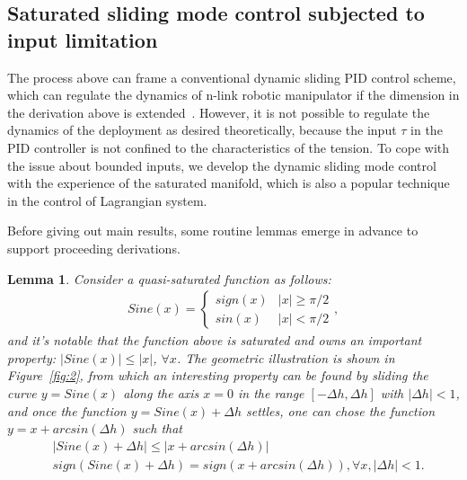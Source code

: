 \documentclass[3p]{elsarticle}
\theoremstyle{plain}
\newtheorem{mylem}{Lemma}
\theoremstyle{remark}
\begin{document}
\subsection{Saturated sliding mode control subjected to input limitation}
The process above can frame a conventional dynamic sliding PID control scheme, which can regulate the dynamics of n-link robotic manipulator if the dimension in the derivation above is extended~\cite{parra2003dynamic}. However, it is not possible to regulate the dynamics of the deployment as desired theoretically, because the input $\tau$ in the PID controller is not confined to the characteristics of the tension. To cope with the issue about bounded inputs, we develop the dynamic sliding mode control with the experience of the saturated manifold, which is also a popular technique in the control of Lagrangian system.\par
Before giving out main results, some routine lemmas emerge in advance to support proceeding derivations.
\begin{mylem}\label{lemma:1}
Consider a quasi-saturated function as follows:
\begin{align}
Sine(x) =
\begin{cases}
sign(x)&\vert x\vert\ge\pi/2\\
sin(x)&\vert x\vert<\pi/2
\end{cases},
\end{align}
and it's notable that the function above is saturated and owns an important property: $\vert Sine(x)\vert\le\vert x\vert$, $\forall x$. The geometric illustration is shown in Figure~\ref{fig:2}, from which an interesting property can be found by sliding the curve $y=Sine(x)$ along the axis $x=0$ in the range $[-\Delta h,\Delta h]$ with $\vert \Delta h \vert< 1$, and once the function $y=Sine(x)+\Delta h$ settles, one can chose the function $y = x+arcsin(\Delta h)$ such that
\begin{align}
&\vert Sine(x)+\Delta h\vert\le\vert x+arcsin(\Delta h)\vert\label{eq:lem11}\\
&sign(Sine(x)+\Delta h)=sign(x+arcsin(\Delta h)), \forall x, \vert\Delta h\vert<1\label{eq:lem12}.
\end{align}
\end{mylem}
\end{document}
